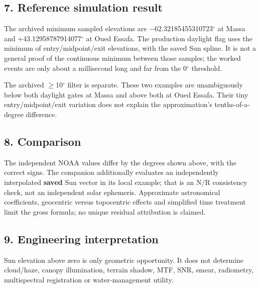 \documentclass[10pt,a4paper]{article}
\numberwithin{equation}{section}
\begin{document}
\subsection*{7. Reference simulation result}
\begin{sloppypar}The archived minimum sampled elevations are \ensuremath{-}62.32185455310723\ensuremath{{}^{\circ}} at Massa and +43.12958787914077\ensuremath{{}^{\circ}} at Oued Essafa. The production daylight flag uses the minimum of entry/midpoint/exit elevations, with the saved Sun spline. It is not a general proof of the continuous minimum between those samples; the worked events are only about a millisecond long and far from the 0\ensuremath{{}^{\circ}} threshold.\end{sloppypar}


\begin{sloppypar}The archived \ensuremath{\ge}10\ensuremath{{}^{\circ}} filter is separate. These two examples are unambiguously below both daylight gates at Massa and above both at Oued Essafa. Their tiny entry/midpoint/exit variation does not explain the approximation's tenths-of-a-degree difference.\end{sloppypar}


\subsection*{8. Comparison}
\begin{sloppypar}The independent NOAA values differ by the degrees shown above, with the correct signs. The companion additionally evaluates an independently interpolated \textbf{saved} Sun vector in its local example; that is an N/R consistency check, not an independent solar ephemeris. Approximate astronomical coefficients, geocentric versus topocentric effects and simplified time treatment limit the gross formula; no unique residual attribution is claimed.\end{sloppypar}


\subsection*{9. Engineering interpretation}
\begin{sloppypar}Sun elevation above zero is only geometric opportunity. It does not determine cloud/haze, canopy illumination, terrain shadow, MTF, SNR, smear, radiometry, multispectral registration or water-management utility.\end{sloppypar}
\end{document}
